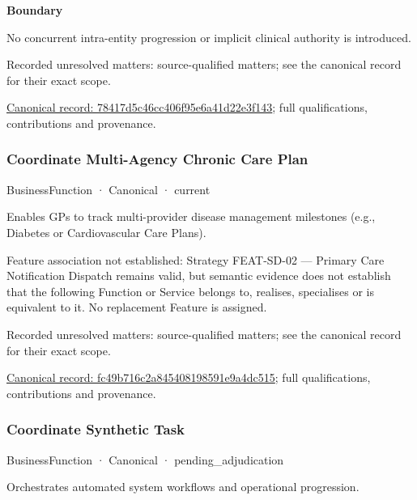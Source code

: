\textbf{Boundary}



No concurrent intra-entity progression or implicit clinical authority is introduced.


{\small Recorded unresolved matters: source-qualified matters; see the canonical record for their exact scope.}\par
{\footnotesize \href{../../../../continuum/business/business-function/78417d5c46cc406f95e6a41d22e3f143.md}{Canonical record: 78417d5c46cc406f95e6a41d22e3f143}; full qualifications, contributions and provenance.}\par
\subsubsection{Coordinate Multi-Agency Chronic Care Plan}

\label{element:fc49b716c2a845408198591e9a4dc515}
{\small BusinessFunction · Canonical · current}\par

Enables GPs to track multi-provider disease management milestones (e.g., Diabetes or Cardiovascular Care Plans).



Feature association not established: Strategy FEAT-SD-02 — Primary Care Notification Dispatch remains valid, but semantic evidence does not establish that the following Function or Service belongs to, realises, specialises or is equivalent to it. No replacement Feature is assigned.


{\small Recorded unresolved matters: source-qualified matters; see the canonical record for their exact scope.}\par
{\footnotesize \href{../../../../continuum/business/business-function/fc49b716c2a845408198591e9a4dc515.md}{Canonical record: fc49b716c2a845408198591e9a4dc515}; full qualifications, contributions and provenance.}\par
\subsubsection{Coordinate Synthetic Task}

\label{element:6cb88c7e689648b1bd0a4d1e26b12f9b}
{\small BusinessFunction · Canonical · pending\_adjudication}\par

Orchestrates automated system workflows and operational progression.


